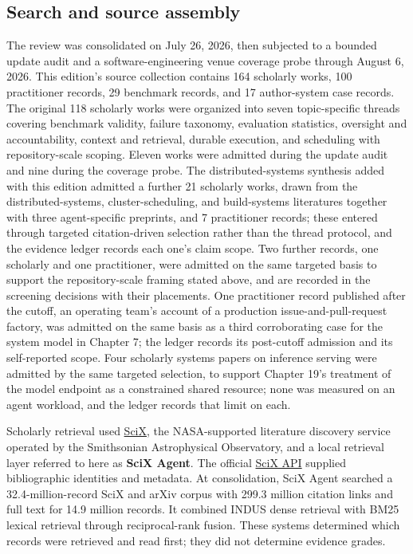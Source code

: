 \hypertarget{search-and-source-assembly}{%
\subsection{Search and source assembly}\label{search-and-source-assembly}}

The review was consolidated on July 26, 2026, then subjected to a bounded update audit and a software-engineering venue coverage probe through August 6, 2026. This edition's source collection contains 164 scholarly works, 100 practitioner records, 29 benchmark records, and 17 author-system case records. The original 118 scholarly works were organized into seven topic-specific threads covering benchmark validity, failure taxonomy, evaluation statistics, oversight and accountability, context and retrieval, durable execution, and scheduling with repository-scale scoping. Eleven works were admitted during the update audit and nine during the coverage probe. The distributed-systems synthesis added with this edition admitted a further 21 scholarly works, drawn from the distributed-systems, cluster-scheduling, and build-systems literatures together with three agent-specific preprints, and 7 practitioner records; these entered through targeted citation-driven selection rather than the thread protocol, and the evidence ledger records each one's claim scope. Two further records, one scholarly and one practitioner, were admitted on the same targeted basis to support the repository-scale framing stated above, and are recorded in the screening decisions with their placements. One practitioner record published after the cutoff, an operating team's account of a production issue-and-pull-request factory, was admitted on the same basis as a third corroborating case for the system model in Chapter 7; the ledger records its post-cutoff admission and its self-reported scope. Four scholarly systems papers on inference serving were admitted by the same targeted selection, to support Chapter 19's treatment of the model endpoint as a constrained shared resource; none was measured on an agent workload, and the ledger records that limit on each.

Scholarly retrieval used \href{https://scixplorer.org/scixabout/}{SciX}, the NASA-supported literature discovery service operated by the Smithsonian Astrophysical Observatory, and a local retrieval layer referred to here as \textbf{SciX Agent}. The official \href{https://scixplorer.org/scixhelp/api-scix/}{SciX API} supplied bibliographic identities and metadata. At consolidation, SciX Agent searched a 32.4-million-record SciX and arXiv corpus with 299.3 million citation links and full text for 14.9 million records. It combined INDUS dense retrieval with BM25 lexical retrieval through reciprocal-rank fusion. These systems determined which records were retrieved and read first; they did not determine evidence grades.

